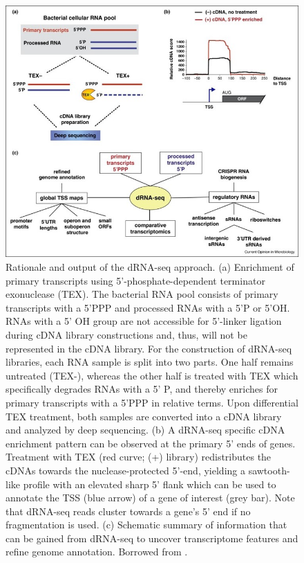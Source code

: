 \begin{figure}[!ht]
    \centering
    \includegraphics[width=1\linewidth]{./figure/dif_rnaseq.jpg}
    \caption{Rationale and output of the dRNA-seq approach. (a) Enrichment of primary transcripts using 5'-phosphate-dependent 
    terminator exonuclease (TEX). The bacterial RNA pool consists of primary transcripts with a 5'PPP and processed RNAs 
    with a 5'P or 5'OH. RNAs with a 5' OH group are not accessible for 5'-linker ligation during cDNA library constructions 
    and, thus, will not be represented in the cDNA library. For the construction of dRNA-seq libraries, each RNA sample is 
    split into two parts. One half remains untreated (TEX-), whereas the other half is treated with TEX which specifically 
    degrades RNAs with a 5' P, and thereby enriches for primary transcripts with a 5'PPP in relative terms. Upon differential 
    TEX treatment, both samples are converted into a cDNA library and analyzed by deep sequencing. (b) A dRNA-seq specific 
    cDNA enrichment pattern can be observed at the primary 5' ends of genes. Treatment with TEX (red curve; (+) library) 
    redistributes the cDNAs towards the nuclease-protected 5'-end, yielding a sawtooth-like profile with an elevated sharp 
    5' flank which can be used to annotate the TSS (blue arrow) of a gene of interest (grey bar). Note that dRNA-seq reads 
    cluster towards a gene's 5' end if no fragmentation is used. (c) Schematic summary of information that can be gained 
    from dRNA-seq to uncover transcriptome features and refine genome annotation. Borrowed from  \cite{Sharma2014}.}
    \label{fig:diff_rnaseq}
\end{figure}
